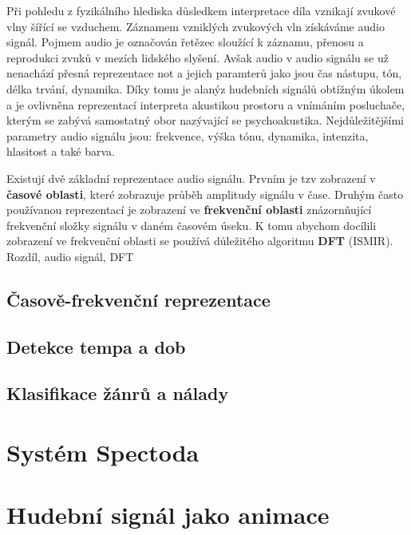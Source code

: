   Při pohledu z fyzikálního hlediska důsledkem interpretace díla vznikají zvukové vlny šířící se vzduchem. 
  Záznamem vzniklých zvukových vln získáváme audio signál.
  Pojmem audio je označován řetězec sloužící k záznamu, přenosu a reprodukci zvuků v mezích lidského slyšení. 
  Avšak audio v audio signálu se už nenachází přesná reprezentace not a jejich paramterů jako jsou čas nástupu, tón, délka trvání, dynamika.
  Díky tomu je alanýz hudebních signálů obtížným úkolem a je ovlivněna reprezentací interpreta akustikou prostoru a vnímáním posluchače, kterým se zabývá samostatný obor nazývající se psychoakustika.
  Nejdůležitějšími parametry audio signálu jsou: frekvence, výška tónu, dynamika, intenzita, hlasitost a také barva.

  
  Existují dvě základní reprezentace audio signálu. Prvním je tzv zobrazení v \textbf{časové oblasti},
  které zobrazuje průběh amplitudy signálu v čase. 
  Druhým často používanou reprezentací je zobrazení ve \textbf{frekvenční oblasti} znázornňující frekvenční složky signálu v daném časovém úseku.
  K tomu abychom docílili zobrazení ve frekvenční oblasti se používá důležitého algoritmu \textbf{\acs{DFT}} (\acl{ISMIR}).
  Rozdíl, audio signál, DFT

  \subsection{Časově-frekvenční reprezentace}
  \subsection{Detekce tempa a dob}
  \subsection{Klasifikace žánrů a nálady}

\section{Systém Spectoda}

\section{Hudební signál jako animace}